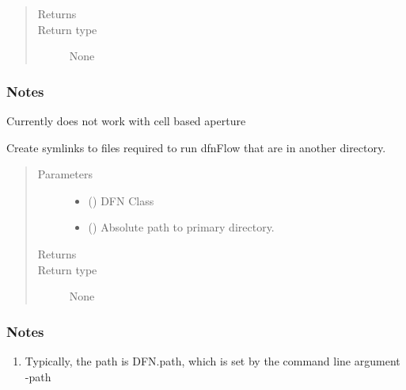 \documentclass[letterpaper,10pt,english]{sphinxmanual}
\begin{document}
\begin{fulllineitems}
\begin{fulllineitems}
\begin{quote}
\begin{description}
\item[{Returns}] \leavevmode


\item[{Return type}] \leavevmode
None

\end{description}\end{quote}
\subsubsection*{Notes}

Currently does not work with cell based aperture

\end{fulllineitems}


\begin{fulllineitems}
\label{\detokenize{pydfnworks:pydfnworks.general.dfnworks.DFNWORKS.create_dfn_flow_links}}
Create symlinks to files required to run dfnFlow that are in another directory.
\begin{quote}\begin{description}
\item[{Parameters}] \leavevmode\begin{itemize}
\item {} 
 () \textendash{} DFN Class

\item {} 
 () \textendash{} Absolute path to primary directory.

\end{itemize}

\item[{Returns}] \leavevmode


\item[{Return type}] \leavevmode
None

\end{description}\end{quote}
\subsubsection*{Notes}
\begin{enumerate}
\def\theenumi{\arabic{enumi}}
\def\labelenumi{\theenumi .}
\makeatletter\def\p@enumii{\p@enumi \theenumi .}\makeatother
\item {} 
Typically, the path is DFN.path, which is set by the command line argument -path


\end{enumerate}
\end{fulllineitems}
\end{fulllineitems}
\end{document}
